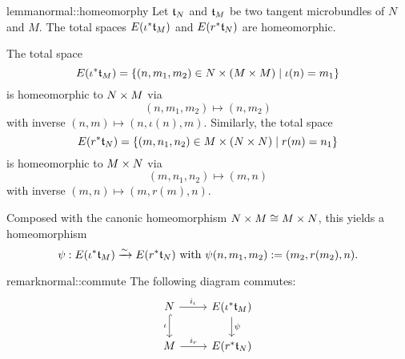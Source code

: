 \begin{mystatement}{lemma}{normal::homeomorphy}
    Let $\mathfrak{t}_N$ and $\mathfrak{t}_M$ be two tangent microbundles of $N$ and $M$.
    The total spaces $E(\iota^*\mathfrak{t}_M)$ and $E(r^*\mathfrak{t}_N)$ are homeomorphic.
\end{mystatement}

\begin{myproof}
    The total space
    \[ E(\iota^*\mathfrak{t}_M) = \{ (n, m_1, m_2) \in N \times (M \times M) \mid \iota(n) = m_1\} \]
    is homeomorphic to $N \times M$ via
    \[ (n, m_1, m_2) \mapsto (n, m_2) \]
    with inverse $(n, m) \mapsto (n, \iota(n), m)$.
    Similarly, the total space
    \[ E(r^*\mathfrak{t}_N) = \{ (m, n_1, n_2) \in M \times (N \times N) \mid r(m) = n_1\} \]
    is homeomorphic to $M \times N$ via
    \[ (m, n_1, n_2) \mapsto (m, n) \]
    with inverse $(m, n) \mapsto (m, r(m), n)$.
    
    Composed with the canonic homeomorphism $N \times M \cong M \times N$, this yields a homeomorphism
    \[ \psi: E(\iota^*\mathfrak{t}_M) \xrightarrow{\sim} E(r^*\mathfrak{t}_N) \text{ with } \psi(n, m_1, m_2) := (m_2, r(m_2), n). \]
\end{myproof}

\begin{mystatement}{remark}{normal::commute}
    The following diagram commutes:
    \[
        \begin{tikzcd}
            N \ar[r, "i_\iota"] \ar[hookrightarrow, "\iota"']{d} & E(\ind{\iota}\bt_M) \ar[d, "\psi"] \\
            M \ar[r, "i_r"] & E(\ind{r}\bt_N)
        \end{tikzcd}
    \]
\end{mystatement}